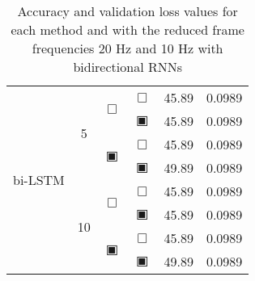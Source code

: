 \begin{table}[H]
\begin{tabular}{|c|c|c|c|c|c|}
		\hline\hline
		\multirow{8}{*}{bi-LSTM}& \multirow{4}{*}{5} & \multirow{2}{*}{$\Box$} & $\Box$ & 45.89 & 0.0989\\\cline{4-6}
				    &                    &                         & $\blackinwhitesquare$ & 45.89 & 0.0989\\\cline{3-6}
				    &                    & \multirow{2}{*}{$\blackinwhitesquare$} & $\Box$ & 45.89 & 0.0989\\\cline{4-6}
				    &                    &                         & $\blackinwhitesquare$ & 49.89 & 0.0989\\\cline{2-6}
				    & \multirow{4}{*}{10} & \multirow{2}{*}{$\Box$} & $\Box$ & 45.89 & 0.0989\\\cline{4-6}
				    &                     &                         & $\blackinwhitesquare$ & 45.89 & 0.0989\\\cline{3-6}
				    &                     & \multirow{2}{*}{$\blackinwhitesquare$} & $\Box$ & 45.89 & 0.0989\\\cline{4-6}
				    &                     &                         & $\blackinwhitesquare$ & 49.89 & 0.0989\\\cline{2-6}
		\hline\hline
	\end{tabular}
	\caption{Accuracy and validation loss values for each method and with the reduced frame frequencies 20 Hz and 10 Hz with bidirectional RNNs}
	\label{tab:stats_frequency_seq_bi}
\end{table}

